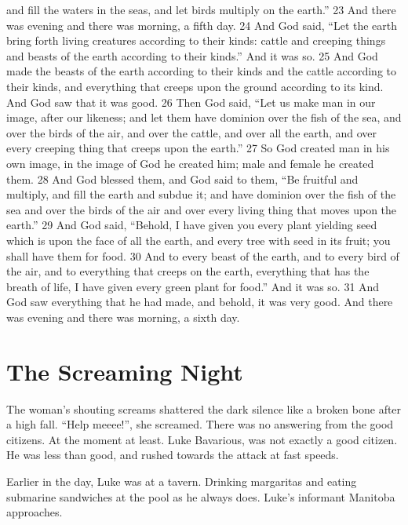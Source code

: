 and fill the waters in the seas, and let birds multiply on the
earth.'' 23 And there was evening and there was morning, a fifth
day. 24 And God said, ``Let the earth bring forth living creatures
according to their kinds: cattle and creeping things and beasts of
the earth according to their kinds.'' And it was so. 25 And God made
the beasts of the earth according to their kinds and the cattle
according to their kinds, and everything that creeps upon the
ground according to its kind. And God saw that it was good. 26 Then
God said, ``Let us make man in our image, after our likeness; and
let them have dominion over the fish of the sea, and over the birds
of the air, and over the cattle, and over all the earth, and over
every creeping thing that creeps upon the earth.'' 27 So God created
man in his own image, in the image of God he created him; male and
female he created them. 28 And God blessed them, and God said to
them, ``Be fruitful and multiply, and fill the earth and subdue it;
and have dominion over the fish of the sea and over the birds of
the air and over every living thing that moves upon the earth.'' 29
And God said, ``Behold, I have given you every plant yielding seed
which is upon the face of all the earth, and every tree with seed
in its fruit; you shall have them for food. 30 And to every beast
of the earth, and to every bird of the air, and to everything that
creeps on the earth, everything that has the breath of life, I have
given every green plant for food.'' And it was so. 31 And God saw
everything that he had made, and behold, it was very good. And
there was evening and there was morning, a sixth day. 

 



\chapter{The Screaming Night}





The woman's shouting screams shattered the dark silence like
a broken bone after a high fall. ``Help meeee!'', she
screamed. There was no answering from the good citizens. At the
moment at least. Luke Bavarious, was not exactly a good citizen. He
was less than good, and rushed towards the attack at fast
speeds.



Earlier in the day, Luke was at a tavern. Drinking margaritas and
eating submarine sandwiches at the pool as he always does.
Luke's informant Manitoba approaches.



